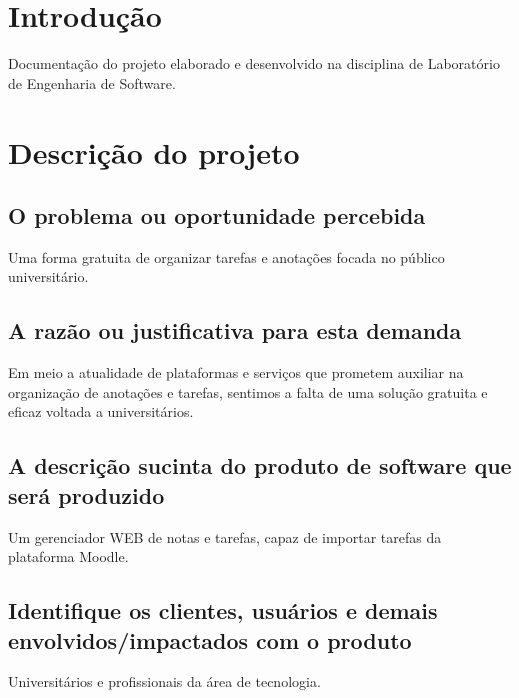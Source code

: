 \documentclass[
	12pt,				%
	openright,			%
	oneside,			    %
	a4paper,				%
	english,			%
	french,			%
	spanish,			%
	brazil			%
	]{abntex2}
\author{Pedro Figueiredo Dias - 41990455, Nathan Silva Macena - 41990404, Lucas Alexandre Arruda Lira - 41547241}
\begin{document}

\frenchspacing 


\imprimircapa

\tableofcontents*
\cleardoublepage



\textual

\chapter{Introdução}
Documentação do projeto elaborado e desenvolvido na disciplina de Laboratório de Engenharia de Software.
\chapter{Descrição do projeto}
\section{O problema ou oportunidade percebida}
Uma forma gratuita de organizar tarefas e anotações focada no público universitário.
\section{A razão ou justificativa para esta demanda}
Em meio a atualidade de plataformas e serviços que prometem auxiliar na organização de anotações e tarefas, sentimos a falta de uma solução gratuita e eficaz voltada a universitários.
\section{A descrição sucinta do produto de software que será produzido}
Um gerenciador WEB de notas e tarefas, capaz de importar tarefas da plataforma Moodle.
\section{Identifique os clientes, usuários e demais envolvidos/impactados com o produto}
Universitários e profissionais da área de tecnologia.
\end{document}
